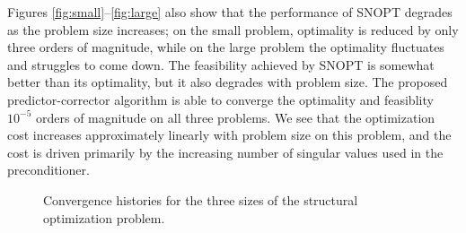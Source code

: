 Figures \ref{fig:small}--\ref{fig:large} also show that the performance of SNOPT
degrades as the problem size increases; on the small problem, optimality is
reduced by only three orders of magnitude, while on the large problem the optimality
fluctuates and struggles to come down.  The feasibility achieved by SNOPT is somewhat better
than its optimality, but it also degrades with problem size.  The proposed
predictor-corrector algorithm is able to converge the optimality and feasiblity
$10^{-5}$ orders of magnitude on all three problems. We see that the
optimization cost increases approximately linearly with problem size on this
problem, and the cost is driven primarily by the increasing number of singular values used
in the preconditioner. 

\begin{figure}[tbp]
  \centering
  \hspace{1em}
  \hspace{1em}
    \caption{Convergence histories for the three sizes of the structural
      optimization problem. \label{fig:struct2}}
\end{figure}

